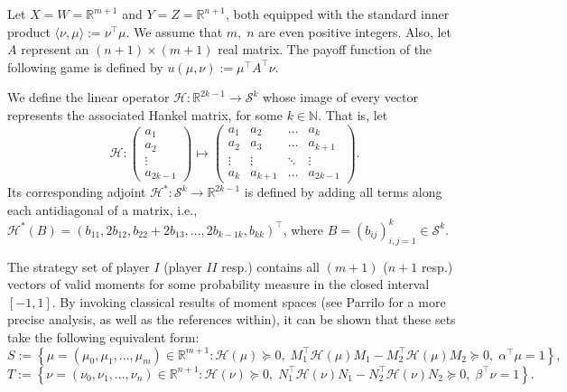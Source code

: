 \documentclass[11pt, twoside]{article}
\numberwithin{equation}{section}
\theoremstyle{definition}
\begin{document}
 Let $X=W=\mathbb{R}^{m+1}$ and $Y=Z=\mathbb{R}^{n+1}$, both equipped with the standard inner product $\langle \nu,\mu\rangle:= \nu^{\top}\mu$. We assume that $m,\;n$ are even positive integers. Also, let $A$ represent an $(n+1)\times (m+1)$ real matrix. The payoff function of the following game is defined by $u(\mu,\nu) := \mu^{\top}A^{\top}\nu$.\par
 
 We define the linear operator $\mathcal{H}:\mathbb{R}^{2k-1}\rightarrow\mathcal{S}^{k}$ whose image of every vector represents the associated Hankel matrix, for some $k\in\mathbb{N}$. That is, let
\begin{equation*}
    \mathcal{H}:\begin{pmatrix}
a_1\\
a_2\\
\vdots\\
a_{2k-1}
\end{pmatrix}\mapsto \begin{pmatrix}
a_1 & a_2 & \ldots & a_{k}\\
a_2 & a_3 & \ldots & a_{k+1}\\
\vdots & \vdots & \ddots & \vdots\\
a_{k} & a_{k+1} & \ldots & a_{2k-1}
\end{pmatrix}.
\end{equation*}
Its corresponding adjoint $\mathcal{H}^*:\mathcal{S}^{k}\rightarrow\mathbb{R}^{2k-1}$ is defined by adding all terms along each antidiagonal of a matrix, i.e., $\mathcal{H}^*(B)=(b_{11},2b_{12},b_{22}+2b_{13},...,2b_{k-1k},b_{kk})^\top$, where $B=(b_{ij})_{i,j=1}^{k}\in\mathcal{S}^k$.\par

The strategy set of player $I$ (player $II$ resp.) contains all $(m+1)$ ($n+1$ resp.) vectors of valid moments for some probability measure in the closed interval $[-1,1]$. By invoking classical results of moment spaces (see Parrilo \cite{parrilo2006polynomial} for a more precise analysis, as well as the references within), it can be shown that these sets take the following equivalent form:
\begin{equation*}
S:= \left\{\mu=(\mu_0,\mu_1,...,\mu_{m})\in\mathbb{R}^{m+1}:\mathcal{H}(\mu)\succeq 0,\;M_1^{\top}\mathcal{H}(\mu)M_1-M_2^{\top}\mathcal{H}(\mu)M_2\succeq 0,\;\alpha^{\top}\mu=1\right\},
\end{equation*}
\begin{equation*}
T:= \left\{\nu=(\nu_0,\nu_1,...,\nu_{n})\in\mathbb{R}^{n+1}:\mathcal{H}(\nu)\succeq 0,\;N_1^{\top}\mathcal{H}(\nu)N_1-N_2^{\top}\mathcal{H}(\nu)N_2\succeq 0,\;\beta^{\top}\nu=1\right\}.\;\;\;\;\;\;
\end{equation*}
\end{document}
